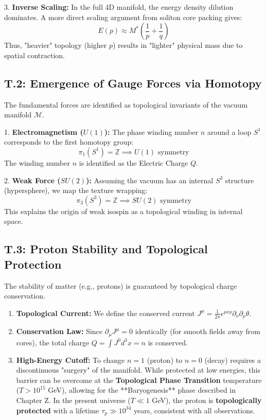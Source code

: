 3. \textbf{Inverse Scaling:} In the full 4D manifold, the energy density dilution dominates. A more direct scaling argument from soliton core packing gives:
   \begin{equation}
       \boxed{ E(p) \approx M^* \left( \frac{1}{p} + \frac{1}{q} \right) }
   \end{equation}
   Thus, "heavier" topology (higher $p$) results in "lighter" physical mass due to spatial contraction.

\subsection{T.2: Emergence of Gauge Forces via Homotopy}
The fundamental forces are identified as topological invariants of the vacuum manifold $\mathcal{M}$.

1. \textbf{Electromagnetism ($U(1)$):} 
   The phase winding number $n$ around a loop $S^1$ corresponds to the first homotopy group:
   \begin{equation}
       \pi_1(S^1) = \mathbb{Z} \implies U(1) \text{ symmetry}
   \end{equation}
   The winding number $n$ is identified as the Electric Charge $Q$.

2. \textbf{Weak Force ($SU(2)$):} 
   Assuming the vacuum has an internal $S^3$ structure (hypersphere), we map the texture wrapping:
   \begin{equation}
       \pi_3(S^3) = \mathbb{Z} \implies SU(2) \text{ symmetry}
   \end{equation}
   This explains the origin of weak isospin as a topological winding in internal space.

\subsection{T.3: Proton Stability and Topological Protection}
The stability of matter (e.g., protons) is guaranteed by topological charge conservation.
\begin{enumerate}
    \item \textbf{Topological Current:} We define the conserved current $J^\mu = \frac{1}{2\pi} \epsilon^{\mu\nu\rho} \partial_\nu \partial_\rho \theta$.
    \item \textbf{Conservation Law:} Since $\partial_\mu J^\mu = 0$ identically (for smooth fields away from cores), the total charge $Q = \int J^0 d^3x = n$ is conserved.
    \item \textbf{High-Energy Cutoff:} To change $n=1$ (proton) to $n=0$ (decay) requires a discontinuous "surgery" of the manifold. While protected at low energies, this barrier can be overcome at the \textbf{Topological Phase Transition} temperature ($T > 10^{15}$ GeV), allowing for the **Baryogenesis** phase described in Chapter Z. In the present universe ($T \ll 1$ GeV), the proton is \textbf{topologically protected} with a lifetime $\tau_p \gg 10^{34}$ years, consistent with all observations.
\end{enumerate}

